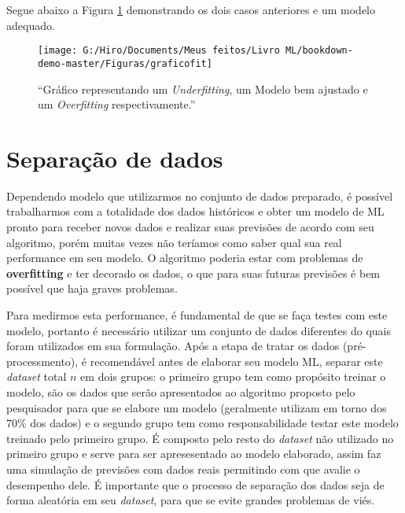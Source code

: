 \documentclass[
  openany]{book}
\begin{document}
Segue abaixo a Figura \ref{fig:graficofit} demonstrando os dois casos anteriores e um modelo adequado.

\begin{figure}

{\centering \texttt{[image: G:/Hiro/Documents/Meus feitos/Livro ML/bookdown-demo-master/Figuras/graficofit]} 

}

\caption{``Gráfico representando um \emph{Underfitting}, um Modelo bem ajustado e um \emph{Overfitting} respectivamente.''}\label{fig:graficofit}
\end{figure}



\hypertarget{separauxe7uxe3o-de-dados}{%
\section{Separação de dados}\label{separauxe7uxe3o-de-dados}}

Dependendo modelo que utilizarmos no conjunto de dados preparado, é possível trabalharmos com a totalidade dos dados históricos e obter um modelo de ML pronto para receber novos dados e realizar suas previsões de acordo com seu algoritmo, porém muitas vezes não teríamos como saber qual sua real performance em seu modelo. O algoritmo poderia estar com problemas de \textbf{overfitting} e ter decorado os dados, o que para suas futuras previsões é bem possível que haja graves problemas.

Para medirmos esta performance, é fundamental de que se faça testes com este modelo, portanto é necessário utilizar um conjunto de dados diferentes do quais foram utilizados em sua formulação. Após a etapa de tratar os dados (pré-processmento), é recomendável antes de elaborar seu modelo ML, separar este \emph{dataset} total \(n\) em dois grupos: o primeiro grupo tem como propósito treinar o modelo, são os dados que serão apresentados ao algoritmo proposto pelo pesquisador para que se elabore um modelo (geralmente utilizam em torno dos 70\% dos dados) e o segundo grupo tem como responsabilidade testar este modelo treinado pelo primeiro grupo. É composto pelo resto do \emph{dataset} não utilizado no primeiro grupo e serve para ser apresesentado ao modelo elaborado, assim faz uma simulação de previsões com dados reais permitindo com que avalie o desempenho dele. É importante que o processo de separação dos dados seja de forma aleatória em seu \emph{dataset}, para que se evite grandes problemas de viés.
\end{document}
